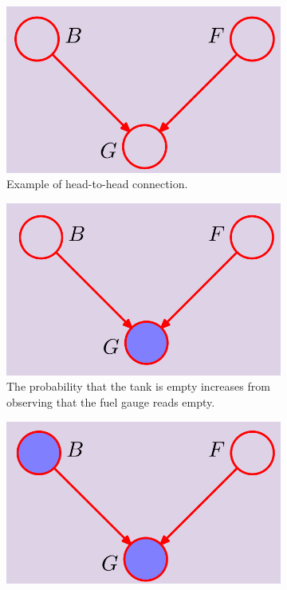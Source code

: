 \begin{figure}
\centering
\begin{subfigure}[t]{0.32\textwidth}
\centering
\includegraphics[width=\textwidth]{images/fuelExample.png}
\caption{Example of head-to-head connection.}
\label{fig:fuelExample}
\end{subfigure}
\hfill
\begin{subfigure}[t]{0.32\textwidth}
\centering
\includegraphics[width=\linewidth]{images/fuelExampleSelected.png}
\caption{The probability that the tank is empty increases from observing that the fuel
gauge reads empty.}
\label{fig:fuelExampleSelected}
\end{subfigure}
\hfill
\begin{subfigure}[t]{0.32\textwidth}
\centering
\includegraphics[width=\linewidth]{images/fuelExamplePart2.png}

\end{subfigure}
\end{figure}
